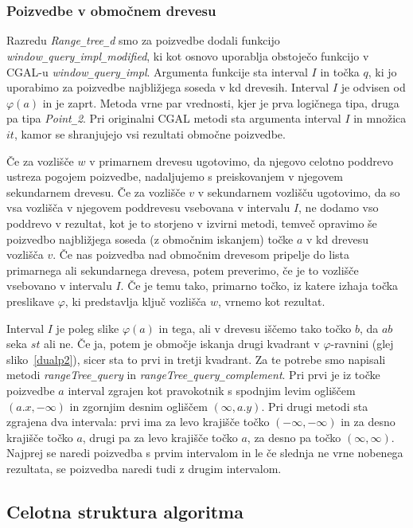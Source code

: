 \documentclass[a4paper, 12pt]{book}
\newcommand{\U}{\texttt{\_}}
\begin{document}
\subsubsection{Poizvedbe v območnem drevesu}
Razredu \textit{Range\U tree\U d} smo za poizvedbe dodali funkcijo \textit{window\U que\-ry\U im\-pl\U mo\-di\-fied}, ki  kot osnovo uporablja obstoječo funkcijo v CGAL-u \textit{window\U que\-ry\U impl}. Argumenta funkcije sta interval $I$ in točka $q$, ki jo uporabimo za poizvedbe najbližjega soseda v kd drevesih. Interval $I$ je odvisen od $\varphi (a)$ in je zaprt. Metoda vrne par vrednosti, kjer je prva logičnega tipa, druga pa tipa \textit{Point\U 2}. Pri originalni CGAL metodi sta argumenta interval $I$ in množica $it$, kamor se shranjujejo vsi rezultati območne poizvedbe.

Če za vozlišče $w$ v primarnem drevesu ugotovimo, da njegovo celotno poddrevo ustreza pogojem poizvedbe, nadaljujemo s preiskovanjem v njegovem sekundarnem drevesu. Če za vozlišče $v$ v sekundarnem vozlišču ugotovimo, da so vsa vozlišča v njegovem poddrevesu vsebovana v intervalu $I$, ne dodamo vso poddrevo v rezultat, kot je to storjeno v izvirni metodi, temveč opravimo še poizvedbo najbližjega soseda (z območnim iskanjem) točke $a$ v kd drevesu vozlišča $v$. Če nas poizvedba nad območnim drevesom pripelje do lista primarnega ali sekundarnega drevesa, potem preverimo, če je to vozlišče vsebovano v intervalu $I$. Če je temu tako, primarno točko, iz katere izhaja točka preslikave $\varphi$, ki predstavlja ključ vozlišča $w$, vrnemo kot rezultat.

Interval $I$ je poleg slike $\varphi (a)$ in tega, ali v drevesu iščemo tako točko $b$, da $ab$ seka $st$ ali ne. Če ja, potem je območje iskanja drugi kvadrant v $\varphi$-ravnini (glej sliko~\ref{dualp2}), sicer sta to prvi in tretji kvadrant. Za te potrebe smo napisali metodi \textit{rangeTree\U query} in \textit{rangeTree\U query\U complement}. Pri prvi je iz točke poizvedbe $a$ interval zgrajen kot pravokotnik s spodnjim levim ogliščem $(a.x, -\infty)$ in zgornjim desnim ogliščem $(\infty, a.y)$. Pri drugi metodi sta zgrajena dva intervala: prvi ima za levo krajišče točko $(-\infty, -\infty)$ in za desno krajišče točko $a$, drugi pa za levo krajišče točko $a$, za desno pa točko $(\infty, \infty)$. Najprej se naredi poizvedba s prvim intervalom in le če slednja ne vrne nobenega rezultata, se poizvedba naredi tudi z drugim intervalom.
\subsection{Celotna struktura algoritma}
\end{document}
